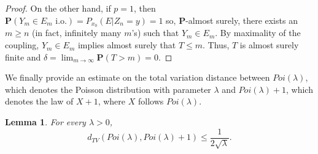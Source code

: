 \documentclass[12pt,a4paper]{article}
\newtheorem{lemma}[theo]{Lemma}
\newcommand{\1}[1]{{\mathbf 1}{\{#1\}}}
\newcommand{\8}{{\infty}}
\begin{document}
\begin{proof}
  On the other hand, if $p=1$, then $\mathbf{P}(Y_m \in E_m \text{ i.o.} ) = P_{x_0}(E|Z_n=y)=1$ so, $\mathbf{P}$-almost surely, there exists an $m\ge n$ (in fact, infinitely many $m$'s) such that $Y_m \in E_m$.
  By maximality of the coupling, %
  $Y_m\in E_m$ implies almost surely that $T\le m$. Thus, $T$ is almost surely finite and $\delta= \lim_{m\to \infty} \mathbf{P}(T>m)=0$. 
\end{proof}





We finally provide an estimate on the total variation distance between $Poi(\lambda)$, which denotes the Poisson distribution with parameter $\lambda$ and $Poi(\lambda)+1$, which denotes the law of $X+1$, where $X$ follows $Poi(\lambda)$.
\begin{lemma}\label{lem:dTV_Poisson}
For every $\lambda > 0$, 
\begin{equation}
  d_{TV}(Poi(\lambda), Poi(\lambda)+1) \le \frac{1}{2\sqrt{\lambda}}.
\end{equation}
\end{lemma}
\end{document}
